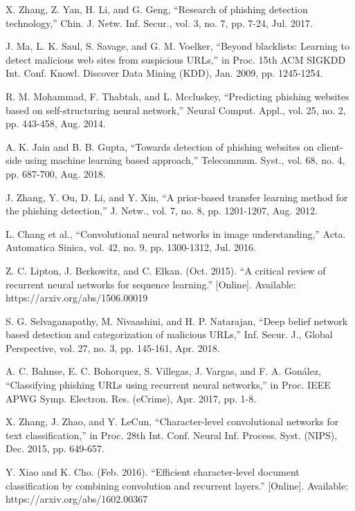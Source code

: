 \documentclass{ieeeaccess}
\begin{document}
\begin{thebibliography}{00}
 X. Zhang, Z. Yan, H. Li, and G. Geng, ``Research of phishing detection
technology,'' Chin. J. Netw. Inf. Secur., vol. 3, no. 7, pp. 7-24, Jul. 2017.

 J. Ma, L. K. Saul, S. Savage, and G. M. Voelker, ``Beyond blacklists:
Learning to detect malicious web sites from suspicious URLs,'' in Proc.
15th ACM SIGKDD Int. Conf. Knowl. Discover Data Mining (KDD),
Jan. 2009, pp. 1245-1254.

 R. M. Mohammad, F. Thabtah, and L. Mccluskey, ``Predicting phishing
websites based on self-structuring neural network,'' Neural Comput. Appl.,
vol. 25, no. 2, pp. 443-458, Aug. 2014.

 A. K. Jain and B. B. Gupta, ``Towards detection of phishing websites on
client-side using machine learning based approach,'' Telecommun. Syst.,
vol. 68, no. 4, pp. 687-700, Aug. 2018.

 J. Zhang, Y. Ou, D. Li, and Y. Xin, ``A prior-based transfer learning
method for the phishing detection,'' J. Netw., vol. 7, no. 8, pp. 1201-1207,
Aug. 2012.

 L. Chang et al., ``Convolutional neural networks in image understanding,''
Acta. Automatica Sinica, vol. 42, no. 9, pp. 1300-1312, Jul. 2016.

 Z. C. Lipton, J. Berkowitz, and C. Elkan. (Oct. 2015). ``A critical review
of recurrent neural networks for sequence learning.'' [Online]. Available:
https://arxiv.org/abs/1506.00019

 S. G. Selvaganapathy, M. Nivaashini, and H. P. Natarajan, ``Deep belief
network based detection and categorization of malicious URLs,'' Inf. Secur.
J., Global Perspective, vol. 27, no. 3, pp. 145-161, Apr. 2018.

 A. C. Bahnse, E. C. Bohorquez, S. Villegas, J. Vargas, and F. A. Gonález,
``Classifying phishing URLs using recurrent neural networks,'' in Proc.
IEEE APWG Symp. Electron. Res. (eCrime), Apr. 2017, pp. 1-8.

 X. Zhang, J. Zhao, and Y. LeCun, ``Character-level convolutional networks
for text classification,'' in Proc. 28th Int. Conf. Neural Inf. Process. Syst.
(NIPS), Dec. 2015, pp. 649-657.

 Y. Xiao and K. Cho. (Feb. 2016). ``Efficient character-level document
classification by combining convolution and recurrent layers.'' [Online].
Available: https://arxiv.org/abs/1602.00367


\end{thebibliography}
\end{document}
